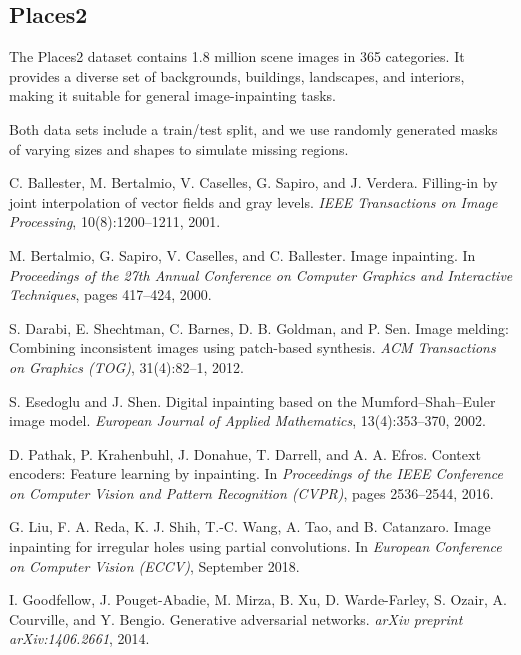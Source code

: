 \documentclass[10pt,twocolumn,letterpaper]{article}
\begin{document}
\subsection{Places2}
The Places2 dataset \cite{zhou2017places} contains 1.8 million scene images in 365 categories. It provides a diverse set of backgrounds, buildings, landscapes, and interiors, making it suitable for general image-inpainting tasks.

Both data sets include a train/test split, and we use randomly generated masks of varying sizes and shapes to simulate missing regions.

{\small

\begin{thebibliography}{99}

C. Ballester, M. Bertalmio, V. Caselles, G. Sapiro, and J. Verdera.
Filling-in by joint interpolation of vector fields and gray levels.
\textit{IEEE Transactions on Image Processing}, 10(8):1200–1211, 2001.

M. Bertalmio, G. Sapiro, V. Caselles, and C. Ballester.
Image inpainting.
In \textit{Proceedings of the 27th Annual Conference on Computer Graphics and Interactive Techniques}, pages 417–424, 2000.

S. Darabi, E. Shechtman, C. Barnes, D. B. Goldman, and P. Sen.
Image melding: Combining inconsistent images using patch-based synthesis.
\textit{ACM Transactions on Graphics (TOG)}, 31(4):82–1, 2012.

S. Esedoglu and J. Shen.
Digital inpainting based on the Mumford–Shah–Euler image model.
\textit{European Journal of Applied Mathematics}, 13(4):353–370, 2002.

D. Pathak, P. Krahenbuhl, J. Donahue, T. Darrell, and A. A. Efros.
Context encoders: Feature learning by inpainting.
In \textit{Proceedings of the IEEE Conference on Computer Vision and Pattern Recognition (CVPR)}, pages 2536–2544, 2016.

G. Liu, F. A. Reda, K. J. Shih, T.-C. Wang, A. Tao, and B. Catanzaro.
Image inpainting for irregular holes using partial convolutions.
In \textit{European Conference on Computer Vision (ECCV)}, September 2018.

I. Goodfellow, J. Pouget-Abadie, M. Mirza, B. Xu, D. Warde-Farley, S. Ozair, A. Courville, and Y. Bengio.
Generative adversarial networks.
\textit{arXiv preprint arXiv:1406.2661}, 2014.


\end{thebibliography}}
\end{document}
